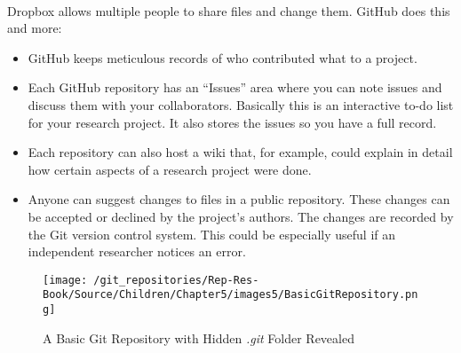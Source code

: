 \vspace{0.25cm}
       
 \\[0.25cm]

Dropbox allows multiple people to share files and change them. GitHub does this and more:

\begin{itemize}
        \item GitHub keeps meticulous records of who contributed what to a project.
        \item Each GitHub repository has an ``Issues'' area where you can note issues and discuss them with your collaborators. Basically this is an interactive to-do list for your research project. It also stores the issues so you have a full record.
        \item Each repository can also host a wiki that, for example, could explain in detail how certain aspects of a research project were done.
        \item Anyone can suggest changes to files in a public repository. These changes can be accepted or declined by the project's authors. The changes are recorded by the Git version control system. This could be especially useful if an independent researcher notices an error. 
\end{itemize}

\vspace{0.25cm}

\begin{wrapfigure}{r}{0.5\textwidth}
    \caption{A Basic Git Repository with Hidden {\emph{.git}} Folder Revealed}
    \label{BasicGitRepo}
        \begin{center}    
        \texttt{[image: /git\_repositories/Rep-Res-Book/Source/Children/Chapter5/images5/BasicGitRepository.png]}
        \end{center}
\end{wrapfigure}

